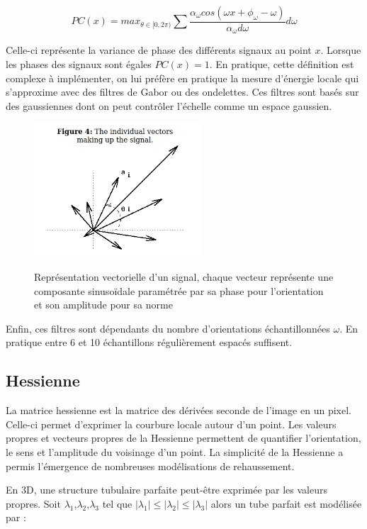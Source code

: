 \begin{equation}
  PC(x) = max_{\theta \in [0,2\pi)} \sum  \frac{ \alpha_{\omega}cos(\omega x + \phi_{\omega} - \omega)  }{ \alpha_{\omega}d \omega } d \omega
\end{equation}

Celle-ci représente la variance de phase des différents signaux au point $x$. Lorsque les phases des signaux sont égales $PC(x)=1$.
En pratique, cette définition est complexe à implémenter, on lui préfère en pratique la mesure d'énergie locale qui s'approxime avec des filtres de Gabor ou des ondelettes. Ces filtres sont basés sur des gaussiennes dont on peut contrôler l'échelle comme un espace gaussien.

\begin{figure}[h]
  \centering
  \includegraphics[height=5cm]{Images/PC_vectors.png}
  \label{fig:phase congruency}
  \caption{Représentation vectorielle d'un signal, chaque vecteur représente une composante sinusoïdale paramétrée par sa phase pour l'orientation et son amplitude pour sa norme}
\end{figure}

Enfin, ces filtres sont dépendants du nombre d'orientations échantillonnées $\omega$. En pratique entre 6 et 10 échantillons régulièrement espacés suffisent. 

\subsection{Hessienne}
\label{sec:EA:rehaussement:hessienne}

La matrice hessienne est la matrice des dérivées seconde de l'image en un pixel. Celle-ci permet d'exprimer la courbure locale autour d'un point.
Les valeurs propres et vecteurs propres de la Hessienne permettent de quantifier l'orientation, le sens et l'amplitude du voisinage d'un point.
La simplicité de la Hessienne a permis l'émergence de nombreuses modélisations de rehaussement.

En 3D, une structure tubulaire parfaite peut-être exprimée par les valeurs propres. Soit $\lambda_1$,$\lambda_2$,$\lambda_3$ tel que $|\lambda_1| \leq |\lambda_2| \leq |\lambda_3|$ alors un tube parfait est modélisée par :

